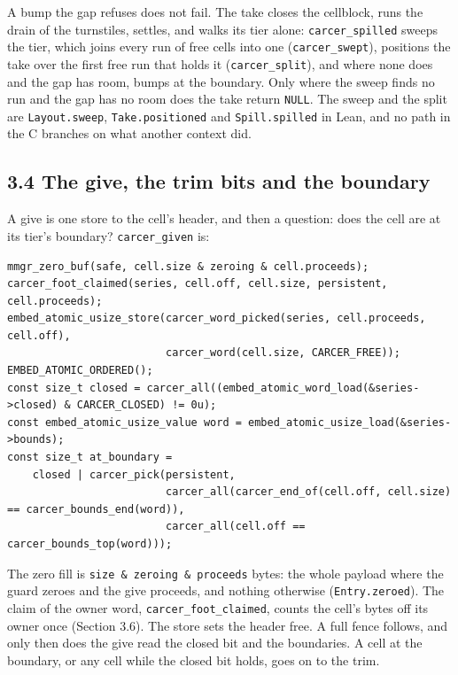 A bump the gap refuses does not fail. The take closes the cellblock, runs the drain of the turnstiles, settles, and walks its tier alone: \texttt{carcer\_\allowbreak{}spilled} sweeps the tier, which joins every run of free cells into one (\texttt{carcer\_\allowbreak{}swept}), positions the take over the first free run that holds it (\texttt{carcer\_\allowbreak{}split}), and where none does and the gap has room, bumps at the boundary. Only where the sweep finds no run and the gap has no room does the take return \texttt{NULL}. The sweep and the split are \texttt{Layout.\allowbreak{}sweep}, \texttt{Take.\allowbreak{}positioned} and \texttt{Spill.\allowbreak{}spilled} in Lean, and no path in the C branches on what another context did.

\subsection{\texorpdfstring{3.4 The give, the trim bits and the boundary}{3.4 The give, the trim bits and the boundary}}

A give is one store to the cell's header, and then a question: does the cell are at its tier's boundary? \texttt{carcer\_\allowbreak{}given} is:

\begin{Verbatim}
mmgr_zero_buf(safe, cell.size & zeroing & cell.proceeds);
carcer_foot_claimed(series, cell.off, cell.size, persistent, cell.proceeds);
embed_atomic_usize_store(carcer_word_picked(series, cell.proceeds, cell.off),
                         carcer_word(cell.size, CARCER_FREE));
EMBED_ATOMIC_ORDERED();
const size_t closed = carcer_all((embed_atomic_word_load(&series->closed) & CARCER_CLOSED) != 0u);
const embed_atomic_usize_value word = embed_atomic_usize_load(&series->bounds);
const size_t at_boundary =
    closed | carcer_pick(persistent,
                         carcer_all(carcer_end_of(cell.off, cell.size) == carcer_bounds_end(word)),
                         carcer_all(cell.off == carcer_bounds_top(word)));
\end{Verbatim}

The zero fill is \texttt{size \& zeroing \& proceeds} bytes: the whole payload where the guard zeroes and the give proceeds, and nothing otherwise (\texttt{Entry.\allowbreak{}zeroed}). The claim of the owner word, \texttt{carcer\_\allowbreak{}foot\_\allowbreak{}claimed}, counts the cell's bytes off its owner once (Section 3.6). The store sets the header free. A full fence follows, and only then does the give read the closed bit and the boundaries. A cell at the boundary, or any cell while the closed bit holds, goes on to the trim.

